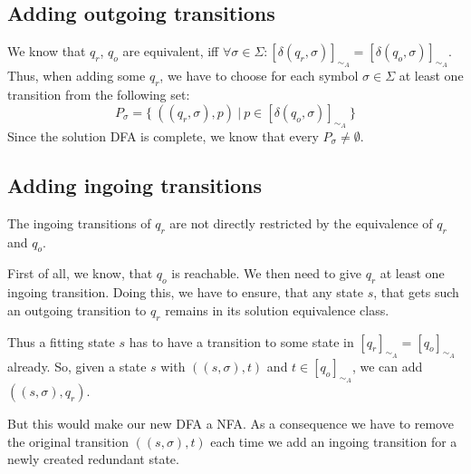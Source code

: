 \subsection{Adding outgoing transitions}

We know that $q_r$, $q_o$ are equivalent, iff $\forall \sigma \in \Sigma \colon [\delta(q_r, \sigma)]_{\sim_A} = [\delta(q_o, \sigma)]_{\sim_A}$. Thus, when adding some $q_r$, we have to choose for each symbol $\sigma \in \Sigma$ at least one transition from the following set:
\[
	P_\sigma = \{\ ((q_r, \sigma), p)\ |\ p \in [\delta(q_o, \sigma)]_{\sim_A}\ \}
\]
Since the solution DFA is complete, we know that every $P_\sigma \neq \emptyset$.


\subsection{Adding ingoing transitions}

The ingoing transitions of $q_r$ are not directly restricted by the equivalence of $q_r$ and $q_o$.

First of all, we know, that $q_o$ is reachable. We then need to give $q_r$ at least one ingoing transition. Doing this, we have to ensure, that any state $s$, that gets such an outgoing transition to $q_r$ remains in its solution equivalence class.
	
Thus a fitting state $s$ has to have a transition to some state in $[q_r]_{\sim_A} = [q_o]_{\sim_A}$ already. So, given a state $s$ with $((s, \sigma), t)$ and $t \in [q_o]_{\sim_A}$, we can add $((s, \sigma), q_r)$.

But this would make our new DFA a NFA. As a consequence we have to remove the original transition $((s, \sigma), t)$ each time we add an ingoing transition for a newly created redundant state.

